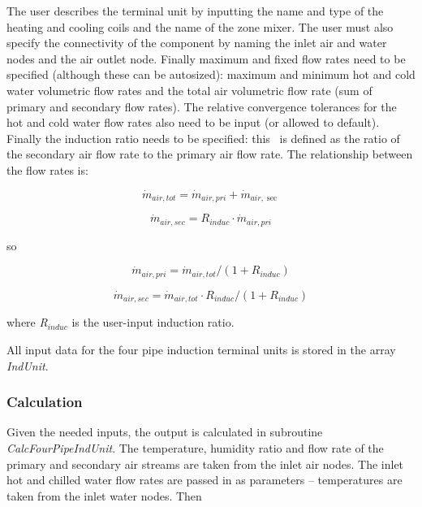 The user describes the terminal unit by inputting the name and type of the heating and cooling coils and the name of the zone mixer. The user must also specify the connectivity of the component by naming the inlet air and water nodes and the air outlet node. Finally maximum and fixed flow rates need to be specified (although these can be autosized): maximum and minimum hot and cold water volumetric flow rates and the total air volumetric flow rate (sum of primary and secondary flow rates). The relative convergence tolerances for the hot and cold water flow rates also need to be input (or allowed to default). Finally the induction ratio needs to be specified: this~ is defined as the ratio of the secondary air flow rate to the primary air flow rate. The relationship between the flow rates is:

\begin{equation}
{\dot m_{air,tot}} = {\dot m_{air,pri}} + {\dot m_{air,\sec }}
\end{equation}

\begin{equation}
{\dot m_{air,sec}} = {R_{induc}}\cdot {\dot m_{air,pri}}
\end{equation}

so

\begin{equation}
{\dot m_{air,pri}} = {\dot m_{air,tot}}/(1 + {R_{induc}})
\end{equation}

\begin{equation}
{\dot m_{air,sec}} = {\dot m_{air,tot}}\cdot {R_{induc}}/(1 + {R_{induc}})
\end{equation}

where \emph{R\(_{induc}\)} is the user-input induction ratio.

All input data for the four pipe induction terminal units is stored in the array \emph{IndUnit}.

\subsubsection{Calculation}\label{calculation}

Given the needed inputs, the output is calculated in subroutine \emph{CalcFourPipeIndUnit}. The temperature, humidity ratio and flow rate of the primary and secondary air streams are taken from the inlet air nodes. The inlet hot and chilled water flow rates are passed in as parameters -- temperatures are taken from the inlet water nodes. Then

